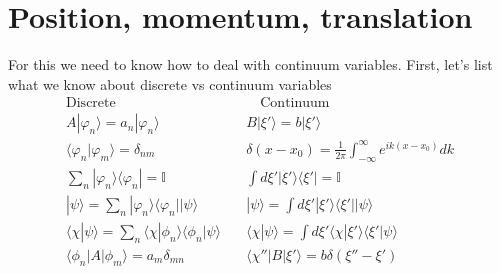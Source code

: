 \documentclass[a4paper, 11pt]{article}
\newcommand{\ket}[1]{|#1\rangle}
\newcommand{\bra}[1]{\langle #1 |}
\newcommand{\braket}[2]{\langle #1 | #2 \rangle}
\begin{document}
\section{Position, momentum, translation} 
	\noindent For this we need to know how to deal with continuum variables. First, let's list what we know about discrete vs continuum variables 
		\begin{align*}
		 	\text{Discrete} \qquad	& \qquad \text{Continuum} \\ 
		 	A\ket{\varphi_n}=a_n\ket{\varphi_n}	&\quad  B\ket{\xi'} = b\ket{\xi'}\\
		 	\braket{\varphi_n}{\varphi_m}=\delta_{nm} &\quad \delta(x-x_0)=\frac{1}{2\pi}\int_{-\infty}^{\infty}e^{ik(x-x_0)}dk \\
		 	\sum_n\ket{\varphi_n}\bra{\varphi_n}=\mathbb{I} &\quad \int d\xi' \ket{\xi'}\bra{\xi'} = \mathbb{I} \\ 
		 	\ket{\psi} = \sum_n \ket{\varphi_n}\bra{\varphi_n}\ket{\psi} &\quad\ket{\psi} = \int d\xi' \ket{\xi'}\bra{\xi'}\ket{\psi} \\ 
		 	\braket{\chi}{\psi} = \sum_n\braket{\chi}{\phi_n}\braket{\phi_n}{\psi} &\quad \braket{\chi}{\psi} = \int d\xi' \braket{\chi}{\xi'}\braket{\xi'}{\psi} \\ 
		 	\bra{\phi_n}A\ket{\phi_m} = a_m\delta_{mn} &\quad \bra{\chi''}B\ket{\xi'} = b\delta(\xi''-\xi')
		\end{align*}
\end{document}
